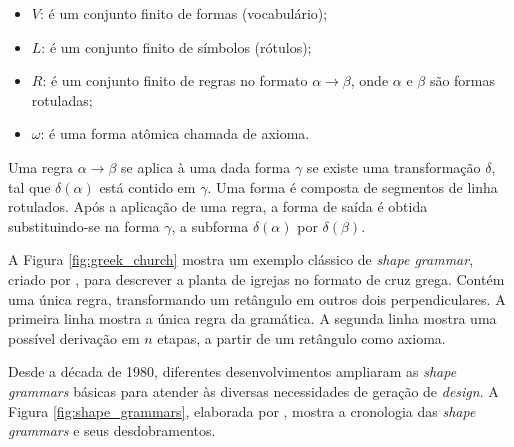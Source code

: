 \begin{itemize}
    \item $V$: é um conjunto finito de formas (vocabulário);
    \item $L$: é um conjunto finito de símbolos (rótulos);
    \item $R$: é um conjunto finito de regras no formato $\alpha \rightarrow \beta$, onde $\alpha$ e $\beta$ são formas rotuladas;
    \item $\omega$: é uma forma atômica chamada de axioma.
\end{itemize}

Uma regra $\alpha \rightarrow \beta$ se aplica à uma dada forma $\gamma$ se existe uma transformação $\delta$, tal que $\delta(\alpha)$ está contido em $\gamma$. Uma forma é composta de segmentos de linha rotulados. Após a aplicação de uma regra, a forma de saída é obtida substituindo-se na forma $\gamma$, a subforma $\delta(\alpha)$ por $\delta(\beta)$.

A Figura \ref{fig:greek_church} mostra um exemplo clássico de \textit{shape grammar}, criado por , para descrever a planta de igrejas no formato de cruz grega. Contém uma única regra, transformando um retângulo em outros dois perpendiculares. A primeira linha mostra a única regra da gramática. A segunda linha mostra uma possível derivação em $n$ etapas, a partir de um retângulo como axioma.

\begin{figure}[h!]
	\centering
	\captionsetup{width=15cm}
	{}	
\end{figure}

Desde a década de 1980, diferentes desenvolvimentos ampliaram as \textit{shape grammars} básicas para atender às diversas necessidades de geração de \textit{design}. A Figura \ref{fig:shape_grammars}, elaborada por , mostra a cronologia das \textit{shape grammars} e seus desdobramentos.

